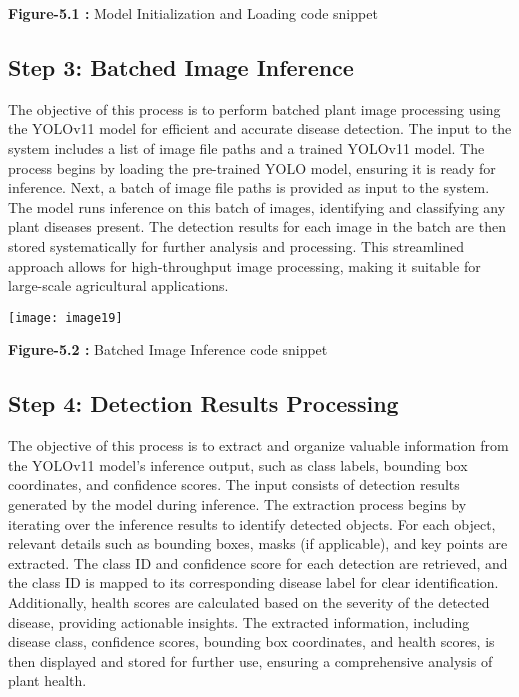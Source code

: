 \documentclass{book} %
\begin{document}
\noindent \textbf{Figure-5.1 :}  Model Initialization and Loading code snippet

\noindent 
\subsection{Step 3: Batched Image Inference }

\noindent The objective of this process is to perform batched plant image processing using the YOLOv11 model for efficient and accurate disease detection. The input to the system includes a list of image file paths and a trained YOLOv11 model. The process begins by loading the pre-trained YOLO model, ensuring it is ready for inference. Next, a batch of image file paths is provided as input to the system. The model runs inference on this batch of images, identifying and classifying any plant diseases present. The detection results for each image in the batch are then stored systematically for further analysis and processing. This streamlined approach allows for high-throughput image processing, making it suitable for large-scale agricultural applications.\textbf{}

\noindent 

\noindent \texttt{[image: image19]}

   \textbf{Figure-5.2 :}  Batched Image Inference code snippet

\noindent 
\subsection{Step 4: Detection Results Processing}

\noindent The objective of this process is to extract and organize valuable information from the YOLOv11 model's inference output, such as class labels, bounding box coordinates, and confidence scores. The input consists of detection results generated by the model during inference. The extraction process begins by iterating over the inference results to identify detected objects. For each object, relevant details such as bounding boxes, masks (if applicable), and key points are extracted. The class ID and confidence score for each detection are retrieved, and the class ID is mapped to its corresponding disease label for clear identification. Additionally, health scores are calculated based on the severity of the detected disease, providing actionable insights. The extracted information, including disease class, confidence scores, bounding box coordinates, and health scores, is then displayed and stored for further use, ensuring a comprehensive analysis of plant health.
\end{document}
